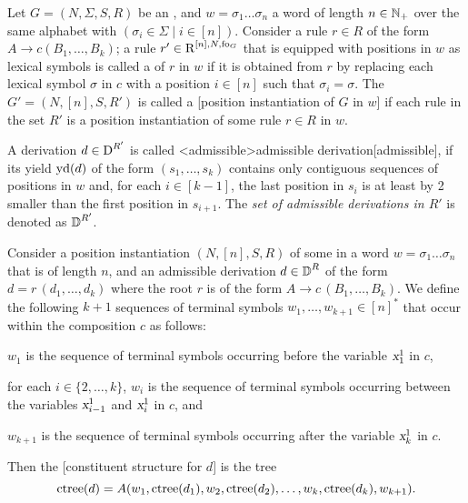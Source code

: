 \documentclass[../../document.tex]{subfiles}
\begin{document}
    \begin{definition}
        Let \(G = (N, \varSigma, S, R)\) be an , and \(w = \sigma_1 \ldots \sigma_n\) a word of length \(n \in \mathbb{N}_+\) over the same alphabet with \((\sigma_i \in \varSigma \mid i \in [n])\).
        Consider a rule \(r\in R\) of the form \(A \to c (B_1, \ldots, B_k)\); a rule \(r' \in \operatorname{R}^{[n],N,\operatorname{fo}_G}\) that is equipped with positions in \(w\) as lexical symbols is called a  of \(r\) in \(w\) if it is obtained from \(r\) by replacing each lexical symbol \(\sigma\) in \(c\) with a position \(i \in [n]\) such that \(\sigma_i = \sigma\).
        The  \(G' = (N, [n], S, R')\) is called a [position instantiation of \(G\) in \(w\)] if each rule in the set \(R'\) is a position instantiation of some rule \(r\in R\) in \(w\).

        A derivation \(d \in \operatorname{D}^{R'}\) is called <admissible>{admissible  derivation}[admissible], if its yield \(\operatorname{yd}(d)\) of the form \((s_1, \ldots, s_k)\) contains only contiguous sequences of positions in \(w\) and, for each \(i \in [k-1]\), the last position in \(s_i\) is at least by 2 smaller than the first position in \(s_{i+1}\).
        The \emph{set of admissible derivations in $R'$} is denoted as \(\operatorname{\mathbb{D}}^{R'}\).
    \end{definition}

    \begin{definition}
        Consider a position instantiation \((N, [n], S, R)\) of some  in a word \(w = \sigma_1 \ldots \sigma_n\) that is of length \(n\), and an admissible derivation \(d \in \operatorname{\mathbb{D}}^R\) of the form \(d = r\,(d_1, \ldots, d_k)\) where the root \(r\) is of the form \(A \to c\,(B_1, \ldots, B_k)\).
        We define the following \(k+1\) sequences of terminal symbols \(w_1, \ldots, w_{k+1} \in [n]^*\) that occur within the composition \(c\) as follows:
        \begin{compactitem}
                \item \(w_1\) is the sequence of terminal symbols occurring before the variable \(\textsl{x}_1^1\) in \(c\),
                \item for each \(i \in \{2, \ldots, k\}\), \(w_i\) is the sequence of terminal symbols occurring between the variables \(\textsl{x}_{i-1}^1\) and \(\textsl{x}_i^1\) in \(c\), and
                \item \(w_{k+1}\) is the sequence of terminal symbols occurring after the variable \(\textsl{x}_k^1\) in \(c\).
            \end{compactitem}
        Then the [constituent structure for \(d\)] is the tree \[
            \operatorname{ctree}(d) = A(w_1, \operatorname{ctree}(d_1), w_2, \operatorname{ctree}(d_2), \ldots, w_k, \operatorname{ctree}(d_k), w_{k+1}) \text{.}
        \]
    \end{definition}
\end{document}
